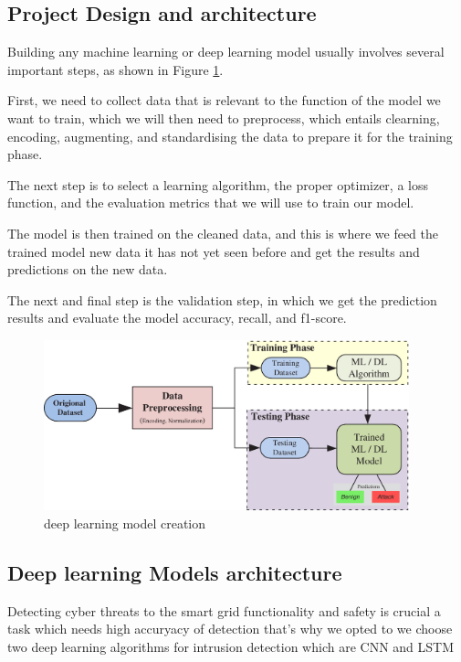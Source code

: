\subsection{Project Design and architecture}
Building any machine learning or deep learning model usually involves several important steps, as shown in Figure  \ref{fig:DL-creation}.


First, we need to collect data that is relevant to the function of the model we want to train, which we will then need to preprocess, which entails clearning, encoding, augmenting, and standardising the data to prepare it for the training phase.


The next step is to select a learning algorithm, the proper optimizer, a loss function, and the evaluation metrics that we will use to train our model.


The model is then trained on the cleaned data, and this is where we feed the trained model new data it has not yet seen before and get the results and predictions on the new data.


The next and final step is the validation step, in which we get the prediction results and evaluate the model accuracy, recall, and f1-score.

\begin{figure}[h]
	\centering
	\includegraphics[width=400px]{figures/DL_creation.jpg}
	\caption{deep learning model creation}
	\label{fig:DL-creation}
\end{figure}









\subsection{Deep learning Models architecture}
Detecting cyber threats to the smart grid functionality and safety is crucial a task which needs high accuryacy of detection that's why we opted to  we choose two deep learning algorithms for intrusion detection which are CNN and LSTM



